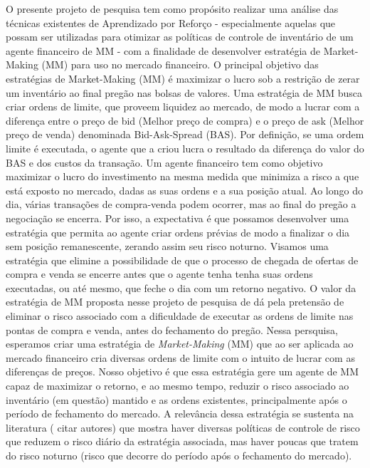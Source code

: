  O presente projeto de pesquisa tem como propósito realizar uma análise das técnicas existentes de Aprendizado por Reforço - especialmente aquelas que possam ser utilizadas para otimizar as políticas de controle de inventário de um agente financeiro de MM - com a finalidade de desenvolver estratégia de Market-Making (MM) para uso no mercado financeiro. 
O principal objetivo das estratégias de Market-Making (MM) é  maximizar o lucro sob a restrição de zerar um inventário ao final pregão nas bolsas de valores. Uma estratégia de MM busca criar ordens de limite, que proveem liquidez ao mercado, de modo a lucrar com a diferença entre o preço de bid (Melhor preço de compra) e o preço de ask (Melhor preço de venda) denominada Bid-Ask-Spread (BAS). Por definição, se uma ordem limite é executada, o agente que a criou lucra o resultado da diferença do valor do BAS e dos custos da transação. 
Um agente financeiro tem como objetivo maximizar o lucro do investimento na mesma medida que minimiza a risco a que está exposto no mercado, dadas as suas ordens e a sua posição atual. Ao longo do dia, várias transações de compra-venda podem ocorrer, mas ao final do pregão a negociação se encerra. Por isso, a expectativa é que possamos desenvolver uma estratégia que permita ao agente criar ordens prévias de modo a finalizar o dia sem posição remanescente, zerando assim seu risco noturno. Visamos uma estratégia que elimine a possibilidade de que o processo de chegada de ofertas de compra e venda se encerre antes que o agente tenha  tenha suas ordens executadas, ou até mesmo, que feche o dia com um retorno negativo. O valor da estratégia de MM proposta nesse projeto de pesquisa de dá pela pretensão de eliminar o risco associado com a dificuldade de executar as ordens de limite nas pontas de compra e venda, antes do fechamento do pregão.
Nessa persquisa, esperamos criar uma estratégia de \textit{Market-Making} (MM) que ao ser aplicada ao mercado financeiro cria diversas ordens de limite com o intuito de lucrar com as diferenças de preços. Nosso objetivo é que essa estratégia gere um agente de MM capaz de maximizar o retorno, e ao mesmo tempo, reduzir o risco associado ao inventário  (em questão) mantido e as ordens existentes, principalmente após o período de fechamento do mercado. A relevância dessa estratégia se sustenta na literatura ( citar autores) que mostra haver diversas políticas de controle de risco que reduzem o risco diário da estratégia associada, mas haver poucas que tratem do risco noturno (risco que decorre do período após o fechamento do mercado). 

